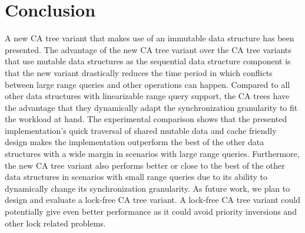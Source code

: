 \documentclass[a4paper,UKenglish]{oasics}
\begin{document}
 \section{Conclusion\label{sec:conc}}
 A new CA tree variant that makes use of an immutable data structure has been presented.
 The advantage of the new CA tree variant over the CA tree variants that use mutable data structures as the sequential data structure component is that the new variant drastically reduces the time period in which conflicts between large range queries and other operations can happen.
 Compared to all other data structures with linearizable range query support, the CA trees have the advantage that they dynamically adapt the synchronization granularity to fit the workload at hand.
 The experimental comparison shows that the presented implementation's quick traversal of shared mutable data and cache friendly design  makes the implementation outperform the best of the other data structures with a wide margin in scenarios with large range queries.
 Furthermore, the new CA tree variant also performs better or close to the best of the other data structures in scenarios with small range queries due to its ability to dynamically change its synchronization granularity.  
 As future work, we plan to design and evaluate a lock-free CA tree variant.
 A lock-free CA tree variant could potentially give even better performance as it could avoid priority inversions and other lock related problems.
 
\end{document}
